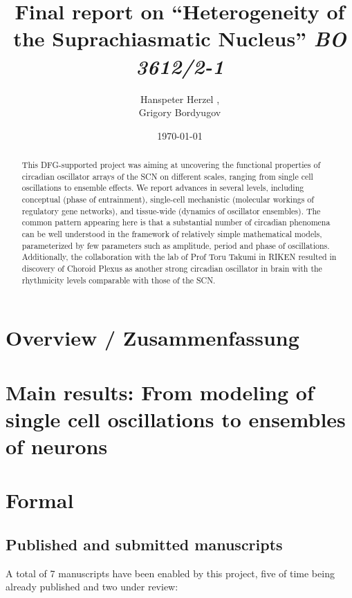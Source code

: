 \documentclass[a4paper]{article}
\title{Final report on ``Heterogeneity of the Suprachiasmatic
Nucleus'' {\em BO 3612/2-1}}
\author{Hanspeter Herzel  \mailhref{h.herzel@biologie.hu-berlin.de},\\
        Grigory Bordyugov \mailhref{grigory.bordyugov@gmail.com}}
\date{\today}
\begin{document}
\maketitle

\begin{abstract}
  This DFG-supported project was aiming at uncovering the functional
  properties of circadian oscillator arrays of the SCN on different
  scales, ranging from single cell oscillations to ensemble effects.
  We report advances in several levels, including conceptual (phase of
  entrainment), single-cell mechanistic (molecular workings of
  regulatory gene networks), and tissue-wide (dynamics of oscillator
  ensembles). The common pattern appearing here is that a substantial
  number of circadian phenomena can be well understood in the
  framework of relatively simple mathematical models, parameterized by
  few parameters such as amplitude, period and phase of oscillations.
  Additionally, the collaboration with the lab of Prof Toru Takumi in
  RIKEN resulted in discovery of Choroid Plexus as another strong
  circadian oscillator in brain with the rhythmicity levels comparable
  with those of the SCN.
\end{abstract}

\tableofcontents

\section{Overview / Zusammenfassung}

\section{Main results: From modeling of single cell oscillations to
ensembles of neurons}








\section{Formal}

\subsection{Published and submitted manuscripts}
A total of 7 manuscripts have been enabled by this project, five of
time being already published and two under review:
\cite{bordyugov2015tuning,schmal2015theoretical,kondoff2015modeling,schmal2017moran,wagner2017plant,myung2017choroid,schmal2017measuring}
\end{document}
